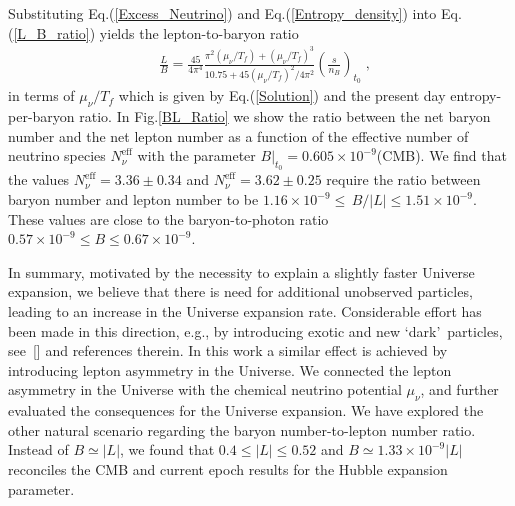 Substituting Eq.\;(\ref{Excess_Neutrino}) and Eq.\;(\ref{Entropy_density}) into Eq.\;(\ref{L_B_ratio}) yields the lepton-to-baryon ratio
\begin{align}\label{L_B_ratio_final}
&\frac{L}{B}=\frac{45}{4\pi^4}\frac{\pi^2(\mu_\nu/T_f)+(\mu_\nu/T_f)^3}{10.75+{45}(\mu_\nu/T_f)^2/{4\pi^2}}\left(\frac{s}{n_B}\right)_{\!\!t_0}\;,
\end{align}
in terms of $\mu_\nu/T_f$ which is given by Eq.(\ref{Solution}) and the present day entropy-per-baryon ratio. In Fig.\;\ref{BL_Ratio} we show the ratio between the net baryon number and the net lepton number as a function of the effective number of neutrino species $N^{\mathrm{eff}}_\nu$ with the parameter $ B|_{t_0} =0.605\times 10^{-9}$(CMB). We find that the values $N_\nu^{\mathrm{eff}}=3.36\pm0.34$ and $N_\nu^{\mathrm{eff}}= 3.62\pm0.25$ require the ratio between baryon number and lepton number to be $1.16 \times 10^{-9} \leqslant\, B/|L| \leqslant 1.51\times 10^{-9}$. These values are close to the baryon-to-photon ratio $0.57 \times 10^{-9} \leqslant B  \leqslant 0.67\times 10^{-9}$. 


In summary, motivated by the necessity to explain a slightly faster Universe expansion, we believe that there is need for additional unobserved particles,  leading to an increase  in the Universe expansion rate. Considerable effort has been made in this direction, e.g., by introducing exotic and new \lq dark\rq\ particles, see~[\cite{Birrell:2014cja}] and references therein. In this work a similar effect is achieved by introducing lepton asymmetry in the Universe. We connected the lepton asymmetry in the Universe with the chemical neutrino potential $\mu_\nu$,
and further evaluated the consequences for the Universe expansion. We have explored the other natural scenario regarding the baryon number-to-lepton number ratio. Instead of $B\simeq |L|$, we found that $0.4\leqslant|L| \leqslant0.52$ and $B\simeq 1.33\times 10^{-9}|L|$ reconciles the CMB and current epoch results for the Hubble expansion parameter.

